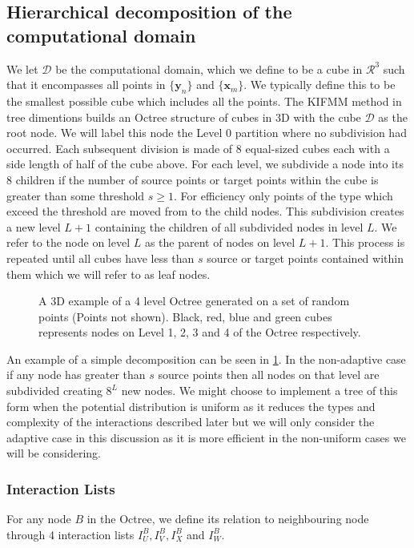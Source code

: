 \subsection{Hierarchical decomposition of the computational domain}
We let $\mathcal{D}$ be the computational domain, which we define to be a cube in $\mathcal{R}^3$ such that it encompasses all points in $\{\bm{y}_n\}$ and $\{\bm{x}_m\}$. We typically define this to be the smallest possible cube which includes all the points. The KIFMM method in tree dimentions builds an Octree structure of cubes in 3D with the cube $\mathcal{D}$ as the root node. We will label this node the Level $0$ partition where no subdivision had occurred. Each subsequent division is made of $8$ equal-sized cubes each with a side length of half of the cube above. For each level, we subdivide a node into its $8$ children if the number of source points or target points within the cube is greater than some threshold $s\geq 1$. For efficiency only points of the type which exceed the threshold are moved from to the child nodes. This subdivision creates a new level $L+1$ containing the children of all subdivided nodes in level $L$. We refer to the node on level $L$ as the parent of nodes on level $L+1$. This process is repeated until all cubes have less than $s$ source or target points contained within them which we will refer to as leaf nodes.

\begin{figure}[ht]
    \centering
    \resizebox{.6\linewidth}{!}{}
    \caption{A 3D example of a 4 level Octree generated on a set of random points (Points not shown). Black, red, blue and green cubes represents nodes on Level 1, 2, 3 and 4 of the Octree respectively.}
    \label{fig:Decompostionexample}
\end{figure}

An example of a simple decomposition can be seen in \cref{fig:Decompostionexample}. In the non-adaptive case if any node has greater than $s$ source points then all nodes on that level are subdivided creating $8^L$ new nodes. We might choose to implement a tree of this form when the potential distribution is uniform as it reduces the types and complexity of the interactions described later but we will only consider the adaptive case in this discussion as it is more efficient in the non-uniform cases we will be considering.

\subsubsection{Interaction Lists}
For any node $B$ in the Octree, we define its relation to neighbouring node through 4 interaction lists $I_U^B, I_V^B, I_X^B$ and $I_W^B$.

